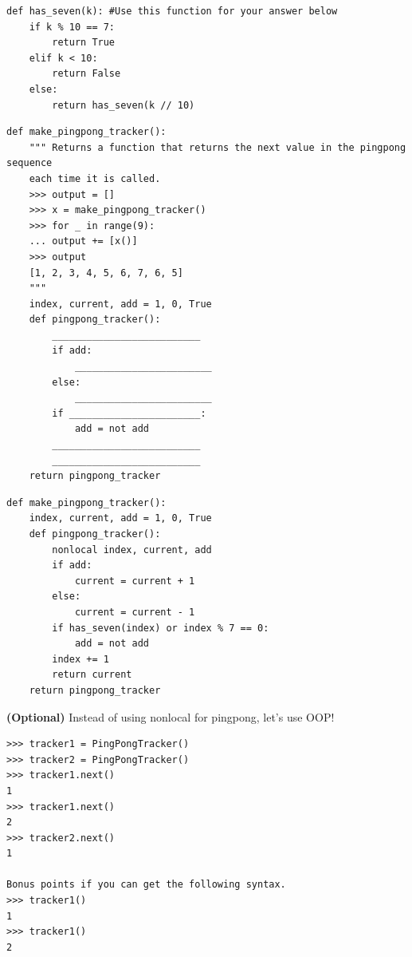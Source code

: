 \documentclass{exam}
\begin{document}
\begin{questions}
\begin{blocksection}
\begin{lstlisting}
def has_seven(k): #Use this function for your answer below
    if k % 10 == 7:
        return True
    elif k < 10:
        return False
    else:
        return has_seven(k // 10)
\end{lstlisting}
\end{blocksection}

\begin{blocksection}
\begin{lstlisting}
def make_pingpong_tracker():
    """ Returns a function that returns the next value in the pingpong sequence
    each time it is called.
    >>> output = []
    >>> x = make_pingpong_tracker()
    >>> for _ in range(9):
    ... output += [x()]
    >>> output
    [1, 2, 3, 4, 5, 6, 7, 6, 5]
    """
    index, current, add = 1, 0, True
    def pingpong_tracker():
        __________________________
        if add:
            ________________________
        else:
            ________________________
        if _______________________:
            add = not add
        __________________________
        __________________________  
    return pingpong_tracker

\end{lstlisting}

\begin{solution}
\begin{lstlisting}
def make_pingpong_tracker():
    index, current, add = 1, 0, True
    def pingpong_tracker():
        nonlocal index, current, add
        if add:
            current = current + 1
        else:
            current = current - 1
        if has_seven(index) or index % 7 == 0:
            add = not add
        index += 1
        return current
    return pingpong_tracker
\end{lstlisting}
\end{solution}

\end{blocksection}

\begin{blocksection}
\question \textbf{(Optional)} Instead of using nonlocal for pingpong, let's use OOP!

\begin{lstlisting}
>>> tracker1 = PingPongTracker()
>>> tracker2 = PingPongTracker()
>>> tracker1.next()
1
>>> tracker1.next()
2
>>> tracker2.next()
1

Bonus points if you can get the following syntax.
>>> tracker1()
1
>>> tracker1()
2


\end{lstlisting}
\end{blocksection}
\end{questions}
\end{document}
